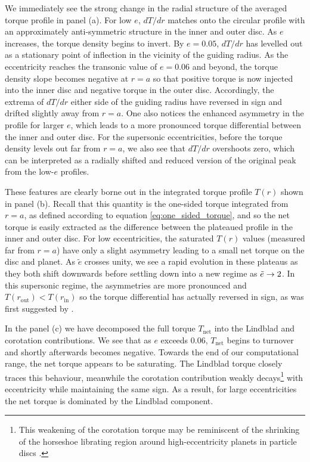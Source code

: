 We immediately see the strong change in the radial structure of the averaged torque profile in panel (a). For low $e$, $dT/dr$ matches onto the circular profile with an approximately anti-symmetric structure in the inner and outer disc. As $e$ increases, the torque density begins to invert. By $e=0.05$, $dT/dr$ has levelled out as a stationary point of inflection in the vicinity of the guiding radius. As the eccentricity reaches the transonic value of $e = 0.06$ and beyond, the torque density slope becomes negative at $r=a$ so that positive torque is now injected into the inner disc and negative torque in the outer disc. Accordingly, the extrema of $dT/dr$ either side of the guiding radius have reversed in sign and drifted slightly away from $r = a$. One also notices the enhanced asymmetry in the profile for larger $e$, which leads to a more pronounced torque differential between the inner and outer disc. For the supersonic eccentricities, before the torque density levels out far from $r=a$, we also see that $dT/dr$ overshoots zero, which can be interpreted as a radially shifted and reduced version of the original peak from the low-$e$ profiles.

These features are clearly borne out in the integrated torque profile $T(r)$ shown in panel (b). Recall that this quantity is the one-sided torque integrated from $r=a$, as defined according to equation \eqref{eq:one_sided_torque}, and so the net torque is easily extracted as the difference between the plateaued profile in the inner and outer disc. For low eccentricities, the saturated $T(r)$ values (measured far from $r=a$) have only a slight asymmetry leading to a small net torque on the disc and planet. As $\tilde{e}$ crosses unity, we see a rapid evolution in these plateaus as they both shift downwards before settling down into a new regime as $\Tilde{e}\rightarrow 2$. In this supersonic regime, the asymmetries are more pronounced and $T(r_\textrm{out}) < T(r_\textrm{in})$ so the torque differential has actually reversed in sign, as was first suggested by \cite{PapaloizouLarwood_2000}.

In the panel (c) we have decomposed the full torque $T_\textrm{net}$ into the Lindblad and corotation contributions. We see that as $e$ exceeds 0.06, $T_\textrm{net}$ begins to turnover and shortly afterwards becomes negative. Towards the end of our computational range, the net torque appears to be saturating. The Lindblad torque closely traces this behaviour, meanwhile the corotation contribution weakly decays\footnote{This weakening of the corotation torque may be reminiscent of the shrinking of the horseshoe librating region around high-eccentricity planets in particle discs \citep{Namouni1999,Rafikov2003}.} with eccentricity while maintaining the same sign. As a result, for large eccentricities the net torque is dominated by the Lindblad component. 


